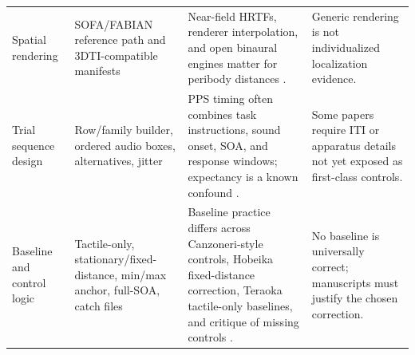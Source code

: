 \documentclass[pdflatex,sn-apa]{sn-jnl}
\begin{document}
\begin{table}[t]
\begin{tabularx}{\textwidth}{>{\raggedright\arraybackslash}p{} >{\raggedright\arraybackslash}p{} >{\raggedright\arraybackslash}X >{\raggedright\arraybackslash}p{}}
Spatial rendering & SOFA/FABIAN reference path and 3DTI-compatible manifests & Near-field HRTFs, renderer interpolation, and open binaural engines matter for peribody distances \citep{Salvador2018,CuevasRodriguez2019,Hoene2017}. & Generic rendering is not individualized localization evidence. \\
Trial sequence design & Row/family builder, ordered audio boxes, alternatives, jitter & PPS timing often combines task instructions, sound onset, SOA, and response windows; expectancy is a known confound \citep{Hobeika2019,Holmes2020}. & Some papers require ITI or apparatus details not yet exposed as first-class controls. \\
Baseline and control logic & Tactile-only, stationary/fixed-distance, min/max anchor, full-SOA, catch files & Baseline practice differs across Canzoneri-style controls, Hobeika fixed-distance correction, Teraoka tactile-only baselines, and critique of missing controls \citep{Canzoneri2012,Hobeika2019,Teraoka2024,Holmes2020}. & No baseline is universally correct; manuscripts must justify the chosen correction. \\
\bottomrule
\end{tabularx}
\end{table}
\end{document}
